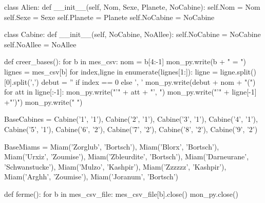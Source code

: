 \documentclass[french]{beamer}
\begin{document}
\begin{frame}[fragile]
\begin{pythoncode}
class Alien:
	def __init__(self, Nom, Sexe, Planete, NoCabine):
		self.Nom = Nom
		self.Sexe = Sexe
		self.Planete = Planete
		self.NoCabine = NoCabine


class Cabine:
	def __init__(self, NoCabine, NoAllee):
		self.NoCabine = NoCabine
		self.NoAllee = NoAllee
\end{pythoncode}


\end{frame}


\begin{frame}[fragile]
\begin{pythoncode}
def creer_bases():
    for b in mes_csv:
        nom = b[4:-1]
        mon_py.write(b + " = { ")
        lignes = mes_csv[b]
        for index,ligne in enumerate(lignes[1:]):
            ligne = ligne.split()[0].split(',')
            debut = '' if index == 0 else ', '
            mon_py.write(debut + nom + "(")
            for att in ligne[:-1]:
                mon_py.write("'" + att + "', ")
            mon_py.write("'" + ligne[-1] +"')")
        mon_py.write(" }\n\n")
\end{pythoncode}


\end{frame}




\begin{frame}[fragile]
\begin{pythoncode}
BaseCabines = { Cabine('1', '1'), Cabine('2', '1'), Cabine('3', '1'), Cabine('4', '1'), Cabine('5', '1'), Cabine('6', '2'), Cabine('7', '2'), Cabine('8', '2'), Cabine('9', '2') }

BaseMiams = { Miam('Zorglub', 'Bortsch'), Miam('Blorx', 'Bortsch'), Miam('Urxiz', 'Zoumise'), Miam('Zbleurdite', 'Bortsch'), Miam('Darneurane', 'Schwanstucke'), Miam('Mulzo', 'Kashpir'), Miam('Zzzzzz', 'Kashpir'), Miam('Arghh', 'Zoumise'), Miam('Joranum', 'Bortsch') }
\end{pythoncode}


\end{frame}



\begin{frame}[fragile]
\begin{pythoncode}
def ferme():
    for b in mes_csv_file:
        mes_csv_file[b].close()
    mon_py.close()
\end{pythoncode}
\end{frame}
\end{document}
